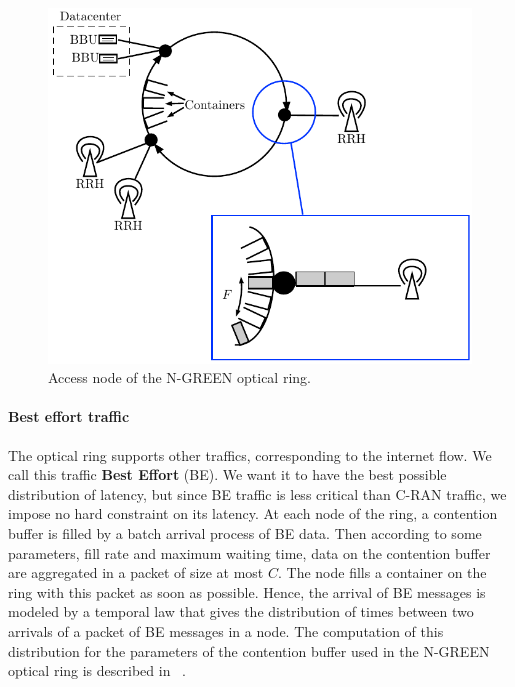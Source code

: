\documentclass[]{llncs}
\begin{document}
    
\begin{figure}[h!]
\begin{center}   

      \includegraphics[scale=0.7]{interface.pdf}
     \caption{Access node of the N-GREEN optical ring.}\label{fig:interface}
     
\end{center}
  \end{figure}


\paragraph{Best effort traffic}

The optical ring supports other traffics, corresponding to the internet flow. We call this traffic \textbf{Best Effort} (BE). We want it to have the best possible distribution of latency, but since BE traffic is less critical than C-RAN traffic, we impose no hard constraint on its latency. At each node of the ring, a contention buffer is filled by a batch arrival process of BE data. Then according to some parameters, fill rate and maximum waiting time, data on the contention buffer are aggregated in a packet of size at most $C$. The node fills a container on the ring with this packet as soon as possible. Hence, the arrival of BE messages is modeled by a temporal law that gives the distribution of times between two arrivals of a packet of BE messages in a node. The computation of this distribution for the parameters of the contention buffer used in the N-GREEN optical ring is described in ~\cite{youssef2018}.
\end{document}
